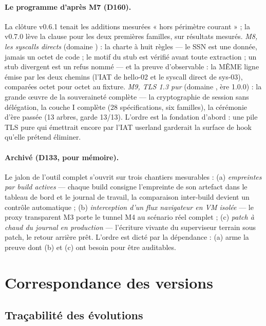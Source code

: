 \paragraph{Le programme d'après M7 (D160).} La clôture v0.6.1 tenait les additions
mesurées « hors périmètre courant » ; la v0.7.0 lève la clause pour les deux
premières familles, sur résultats mesurés. \emph{M8, les syscalls directs} (domaine
) : la charte à huit règles — le SSN est une donnée, jamais un octet de
code ; le motif du stub est vérifié avant toute extraction ; un stub divergent est
un refus nommé — et la preuve d'observable : la MÊME ligne émise par les deux
chemins (l'IAT  de hello-02 et le syscall direct 
de sys-03), comparées octet pour octet au fixture. \emph{M9, TLS 1.3 pur} (domaine
, ère 1.0.0) : la grande œuvre de la souveraineté complète — la
cryptographie de session sans délégation, la couche I complète (28 spécifications,
six familles), la cérémonie d'ère passée (13 arbres, garde 13/13). L'ordre est la
fondation d'abord : une pile TLS pure qui émettrait encore par l'IAT userland
garderait la surface de hook qu'elle prétend éliminer.

\paragraph{Archivé (D133, pour mémoire).} Le jalon de l'outil complet s'ouvrit sur trois
chantiers mesurables : (a) \emph{empreintes par build actives} — chaque build consigne
l'empreinte de son artefact dans le tableau de bord et le journal de travail, la
comparaison inter-build devient un contrôle automatique ; (b) \emph{interception d'un
flux navigateur en VM isolée} — le proxy transparent M3 porte le tunnel M4 au scénario
réel complet ; (c) \emph{patch à chaud du journal en production} — l'écriture vivante
du superviseur terrain sous patch, le retour arrière prêt. L'ordre est dicté par la
dépendance : (a) arme la preuve dont (b) et (c) ont besoin pour être auditables.

\section{Correspondance des versions}\label{sec:correspondance}

\subsection{Traçabilité des évolutions}\label{sec:evolutions}


